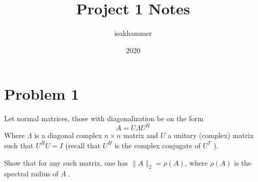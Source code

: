 \documentclass{article}
\title{Project 1 Notes}
\author{isakhammer }
\date{2020}
\theoremstyle{remark}
\newcommand{\newpara}
  {
  \vskip 0.4cm
  }
\begin{document}
\maketitle
\tableofcontents
\newpage

\newpage
\section{Problem 1}%
\label{sec:problem_1}

Let normal matrices, those with diagonalization be on the form \[
A = U \Lambda U^{H} 
\] 
Where $\Lambda $ is a diagonal complex $n\times n $ matrix and $U$ a unitary (complex) matrix such that $U ^{H} U = I$ (recall that $U^{H}$ is the complex conjugate of $U^{T}$ ).
\newpara
Show that for any such matrix, one has $\|A\|_{2} = \rho \left( A \right)$, where $\rho \left( A \right) $ is the spectral radius of $A$ .
\end{document}
